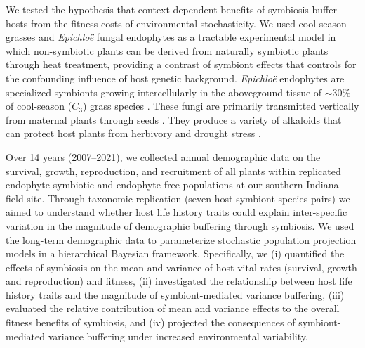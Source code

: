 \documentclass[9pt,twocolumn,twoside]{pnas-new}
\begin{document}
We tested the hypothesis that context-dependent benefits of symbiosis buffer hosts from the fitness costs of environmental stochasticity.
We used cool-season grasses and \emph{Epichlo\"{e}} fungal endophytes as a tractable experimental model in which non-symbiotic plants can be derived from naturally symbiotic plants through heat treatment, providing a contrast of symbiont effects that controls for the confounding influence of host genetic background. 
\emph{Epichlo\"{e}} endophytes are specialized symbionts growing intercellularly in the aboveground tissue of  $\sim30$\% of cool-season ($C_{3}$) grass species \cite{leuchtmann1992systematics}.
These fungi are primarily transmitted vertically from maternal plants through seeds \cite{cheplick2009ecology}.
They produce a variety of alkaloids that can protect host plants from herbivory \cite{brem2001epichloe} and drought stress \cite{decunta2021systematic}.

Over 14 years (2007--2021), we collected annual demographic data on the survival, growth, reproduction, and recruitment of all plants within replicated endophyte-symbiotic and endophyte-free populations at our southern Indiana field site. 
Through taxonomic replication (seven host-symbiont species pairs) we aimed to understand whether host life history traits could explain inter-specific variation in the magnitude of demographic buffering through symbiosis. 
We used the long-term demographic data to parameterize stochastic population projection models in a hierarchical Bayesian framework. 
Specifically, we  (i) quantified the effects of symbiosis on the mean and variance of host vital rates (survival, growth and reproduction) and fitness, (ii) investigated the relationship between host life history traits and the magnitude of symbiont-mediated variance buffering, (iii) evaluated the relative contribution of mean and variance effects to the overall fitness benefits of symbiosis, and (iv) projected the consequences of symbiont-mediated variance buffering under increased environmental variability.
\end{document}
